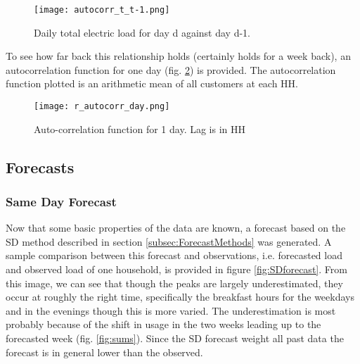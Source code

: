 \documentclass[a4paper]{article}
\begin{document}
\begin{figure}
\centering
\texttt{[image: autocorr\_t\_t-1.png]}
\caption{Daily total electric load for day d against day d-1.}
\label{fig:ty_colour} 
\end{figure}

To see how far back this relationship holds (certainly holds for a week back), an autocorrelation function for one day (fig. \ref{fig:acf_day}) is provided. The autocorrelation function plotted is an arithmetic mean of all customers at each HH.

\begin{figure}
\centering
\texttt{[image: r\_autocorr\_day.png]}
\caption{Auto-correlation function for 1 day. Lag is in HH}
\label{fig:acf_day} 
\end{figure}




\subsection{Forecasts}
\label{subsec:forecasts}

\subsubsection{Same Day Forecast} \label{subsubsec:SD_res}
Now that some basic properties of the data are known, a forecast based on the SD method described in section \ref{subsec:ForecastMethods} was generated. A sample comparison between this forecast and observations, i.e. forecasted load and observed load of one household, is provided in figure \ref{fig:SDforecast}. From this image, we can see that though the peaks are largely underestimated, they occur at roughly the right time, specifically the breakfast hours for the weekdays and in the evenings though this is more varied. The underestimation is most probably because of the shift in usage in the two weeks leading up to the forecasted week (fig. \ref{fig:sums}). Since the SD forecast weight all past data the forecast is in general lower than the observed.
\end{document}
